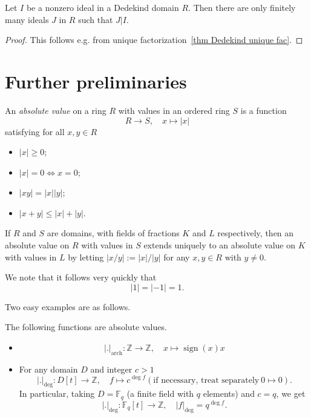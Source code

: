 \documentclass{amsart}
\newcommand{\Z}{\mathbb{Z}}
\newcommand{\F}{\mathbb{F}}
\newcommand{\sign}{\operatorname{sign}}
\begin{document}
\begin{proposition}\label{prop finitely many ideal divisors}
Let $I$ be a nonzero ideal in a Dedekind domain $R$. Then there are only finitely many ideals $J$ in $R$ such that $J|I$.
\end{proposition}

\begin{proof}
This follows e.g. from unique factorization~\ref{thm Dedekind unique fac}.
\end{proof}


\section{Further preliminaries}

An \emph{absolute value} on a ring $R$ with values in an ordered ring $S$ is a function
\[R \to S, \quad x \mapsto |x|\]
satisfying for all $x,y \in R$
\begin{itemize}
\item $|x|\geq 0$;
\item $|x|=0 \Leftrightarrow x=0$;
\item $|x y|=|x| |y|$;
\item $|x+y|\leq |x|+|y|$.
\end{itemize} 

If $R$ and $S$ are domains, with fields of fractions $K$ and $L$ respectively, then an absolute value on $R$ with values in $S$ extends uniquely to an absolute value on $K$ with values in $L$ by letting $|x/y|:=|x|/|y|$ for any $x,y \in R$ with $y\not=0$.

We note that it follows very quickly that 
\[|1|=|-1|=1.\]

Two easy examples are as follows.
\begin{lemma}
The following functions are absolute values.
\begin{itemize}
\item \[ |.|_{\text{arch}}: \Z \to \Z, \quad x \mapsto \sign(x)x\]
\item For any domain $D$ and integer $c>1$
\[ |.|_{\deg}: D[t] \to \Z, \quad f \mapsto c^{\deg f} (\text{if necessary, treat separately}\ 0 \mapsto 0).\]
In particular, taking $D=\F_q$ (a finite field with $q$ elements) and $c=q$, we get
\[ |.|_{\deg}: \F_q[t] \to \Z, \quad |f|_{\deg}=q^{\deg f}.\]
\end{itemize}
\end{lemma}
\end{document}
